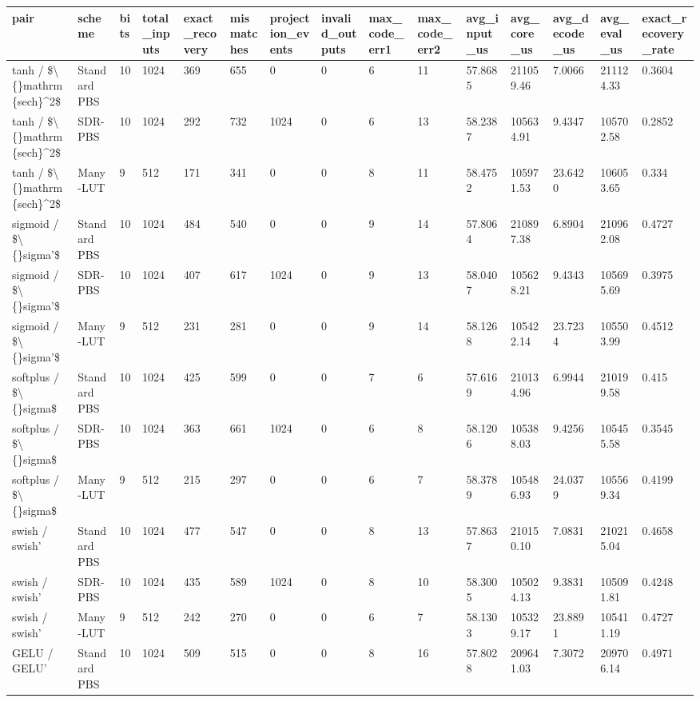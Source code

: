 \small
\setlength{\tabcolsep}{4pt}
\begin{tabular}{lllllllllllllll}
\toprule
pair & scheme & bits & total\_inputs & exact\_recovery & mismatches & projection\_events & invalid\_outputs & max\_code\_err1 & max\_code\_err2 & avg\_input\_us & avg\_core\_us & avg\_decode\_us & avg\_eval\_us & exact\_recovery\_rate \\
\midrule
tanh / \$\textbackslash\{\}mathrm\{sech\}^2\$ & Standard PBS & 10 & 1024 & 369 & 655 & 0 & 0 & 6 & 11 & 57.8685 & 211059.46 & 7.0066 & 211124.33 & 0.3604 \\
tanh / \$\textbackslash\{\}mathrm\{sech\}^2\$ & SDR-PBS & 10 & 1024 & 292 & 732 & 1024 & 0 & 6 & 13 & 58.2387 & 105634.91 & 9.4347 & 105702.58 & 0.2852 \\
tanh / \$\textbackslash\{\}mathrm\{sech\}^2\$ & Many-LUT & 9 & 512 & 171 & 341 & 0 & 0 & 8 & 11 & 58.4752 & 105971.53 & 23.6420 & 106053.65 & 0.334 \\
sigmoid / \$\textbackslash\{\}sigma'\$ & Standard PBS & 10 & 1024 & 484 & 540 & 0 & 0 & 9 & 14 & 57.8064 & 210897.38 & 6.8904 & 210962.08 & 0.4727 \\
sigmoid / \$\textbackslash\{\}sigma'\$ & SDR-PBS & 10 & 1024 & 407 & 617 & 1024 & 0 & 9 & 13 & 58.0407 & 105628.21 & 9.4343 & 105695.69 & 0.3975 \\
sigmoid / \$\textbackslash\{\}sigma'\$ & Many-LUT & 9 & 512 & 231 & 281 & 0 & 0 & 9 & 14 & 58.1268 & 105422.14 & 23.7234 & 105503.99 & 0.4512 \\
softplus / \$\textbackslash\{\}sigma\$ & Standard PBS & 10 & 1024 & 425 & 599 & 0 & 0 & 7 & 6 & 57.6169 & 210134.96 & 6.9944 & 210199.58 & 0.415 \\
softplus / \$\textbackslash\{\}sigma\$ & SDR-PBS & 10 & 1024 & 363 & 661 & 1024 & 0 & 6 & 8 & 58.1206 & 105388.03 & 9.4256 & 105455.58 & 0.3545 \\
softplus / \$\textbackslash\{\}sigma\$ & Many-LUT & 9 & 512 & 215 & 297 & 0 & 0 & 6 & 7 & 58.3789 & 105486.93 & 24.0379 & 105569.34 & 0.4199 \\
swish / swish' & Standard PBS & 10 & 1024 & 477 & 547 & 0 & 0 & 8 & 13 & 57.8637 & 210150.10 & 7.0831 & 210215.04 & 0.4658 \\
swish / swish' & SDR-PBS & 10 & 1024 & 435 & 589 & 1024 & 0 & 8 & 10 & 58.3005 & 105024.13 & 9.3831 & 105091.81 & 0.4248 \\
swish / swish' & Many-LUT & 9 & 512 & 242 & 270 & 0 & 0 & 6 & 7 & 58.1303 & 105329.17 & 23.8891 & 105411.19 & 0.4727 \\
GELU / GELU' & Standard PBS & 10 & 1024 & 509 & 515 & 0 & 0 & 8 & 16 & 57.8028 & 209641.03 & 7.3072 & 209706.14 & 0.4971 \\

\end{tabular}
